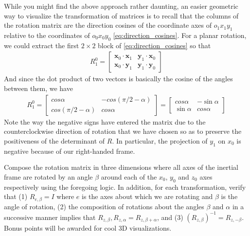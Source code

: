 %
While you might find the above approach rather daunting, an easier geometric way to visualize the transformation of matrices is to recall that the columns of the rotation matrix are the direction cosines of the coordinate axes of $o_1x_1y_1$ relative to the coordinates of $o_0x_0y_0$ \cf \eqref{eq:direction_cosines}. For a planar rotation, we could extract the first $2\times 2$ block of \eqref{eq:direction_cosines} so that 
%
\begin{align}
R_1^0 = \begin{bmatrix}
\bm{x}_0 \cdot \bm{x}_1 & \bm{y}_1 \cdot \bm{x}_0 \\
%
\bm{x}_0 \cdot \bm{y}_1 & \bm{y}_1 \cdot \bm{y}_0
\end{bmatrix} 
\end{align}
%
And since the dot product of two vectors is basically the cosine of the angles between them, we have
%
\begin{align}
R_1^0 =  \begin{bmatrix}
cos \alpha &  -cos(\pi/2 - \alpha) \\
%
cos(\pi/2 - \alpha) & cos \alpha
\end{bmatrix} 
%
=  \begin{bmatrix}
cos \alpha &   - \sin \alpha  \\
%
\sin \alpha  & cos \alpha
\end{bmatrix} 
\end{align}
%
Note the way the negative signs have entered the matrix due to the counterclockwise direction of rotation that we have chosen so as to preserve the positiveness of the determinant of $R$. In particular, the projection of $y_1$ on $x_0$ is negative because of our right-handed frame.

\noindent 
\begin{homework}
	Compose the rotation matrix in three dimensions where all axes of the inertial frame are rotated by an angle $\beta$ around each of the $x_0$, $y_0$ and $z_0$ axes respectively using the foregoing logic. In addition, for each transformation, verify that (1) $R_{e, \beta} = I$ where $e$ is the axes about which we are rotating and $\beta$ is the angle of rotation, (2) the composition of rotations about the angles $\beta$ and $\alpha$ in a successive manner implies that $R_{z, \beta}, R_{z, \alpha} = R_{z, \beta + \alpha}$, and (3) ${(R_{z, \beta})}^{-1} = R_{z, -\beta}$. Bonus points will be awarded for cool 3D visualizations.
\end{homework} 

